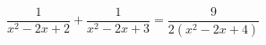 \begin{ex}[type=equation]
	\begin{condition}
		$\dfrac{1}{x^2 -2x + 2} + \dfrac{1}{x^2 - 2x + 3} = \dfrac{9}{2\left(x^2 - 2x + 4\right)}$
	\end{condition}
\end{ex}